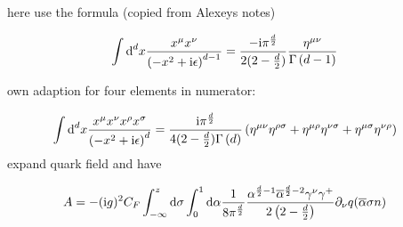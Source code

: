here use the formula (copied from Alexeys notes)

\begin{align}
	\int \text{d} ^d x \frac{x^\mu x^\nu}{\left(-x^2+\text{i} \epsilon\right)^{d-1}}
	&=
	\frac{-\text{i} \pi^{\frac{d}{2}}}{2(2-\frac{d}{2})}\frac{\eta^{\mu\nu}}{\Gamma\left(d-1\right)}
\end{align}

own adaption for four elements in numerator:

\begin{align}
	\int \text{d} ^d  x \frac{x^\mu x^\nu x^\rho x^\sigma}{\left(-x^2+\text{i} \epsilon\right)^{d}}
	&=
	\frac{\text{i} \pi^{\frac{d}{2}}}{4(2-\frac{d}{2})\Gamma\left(d\right)}\left(\eta^{\mu\nu}\eta^{\rho \sigma} + \eta^{\mu \rho} \eta^{\nu \sigma} +\eta^{\mu \sigma}\eta^{\nu \rho}\right)	
\end{align}
expand quark field and have

\begin{align}
	A
	&=
	-(\text{i} g)^2C_F \int_{-\infty}^{z} \text{d} \sigma \int_0^1 \text{d} \alpha \frac{1}{8\pi^{\frac{d}{2}}}\frac{\alpha^{\frac{d}{2}-1} \overline \alpha^{\frac{d}{2}-2}\gamma^\nu\gamma^+}{2\left(2-\frac{d}{2}\right)} \partial_\nu q(\overline \alpha \sigma n )
\end{align}
